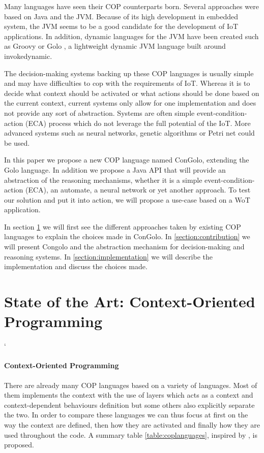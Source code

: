 \documentclass[a4paper]{article}
\begin{document}
Many languages have seen their COP counterparts born. Several approaches were based on Java and the JVM. Because of its high development in embedded system, the JVM seems to be a good candidate for the development of IoT applications. In addition, dynamic languages for the JVM have been created such as Groovy or Golo \cite{ponge_golo_2013}, a lightweight dynamic JVM language built around invokedynamic.

The decision-making systems backing up these COP languages is usually simple and may have difficulties to cop with the requirements of IoT. Whereas it is to decide what context should be activated or what actions should be done based on the current context, current systems only allow for one implementation and does not provide any sort of abstraction. Systems are often simple event-condition-action (ECA) process which do not leverage the full potential of the IoT. More advanced systems such as neural networks, genetic algorithms or Petri net could be used.

In this paper we propose a new COP language named ConGolo, extending the Golo language. In addition we propose a Java API that will provide an abstraction of the reasoning mechanisms, whether it is a simple event-condition-action (ECA), an automate, a neural network or yet another approach. To test our solution and put it into action, we will propose a use-case based on a WoT application.

In section \ref{section:stateoftheart} we will first see the different approaches taken by existing COP languages to explain the choices made in ConGolo. In \ref{section:contribution} we will present Congolo and the abstraction mechanism for decision-making and reasoning systems. In \ref{section:implementation} we will describe the implementation and discuss the choices made.

\section{State of the Art: Context-Oriented Programming}
\label{section:stateoftheart}
`
\paragraph{Context-Oriented Programming}
There are already many COP languages based on a variety of languages. Most of them implements the context with the use of layers which acts as a context and context-dependent behaviours definition but some others also explicitly separate the two. In order to compare these languages we can thus focus at first on the way the context are defined, then how they are activated and finally how they are used throughout the code. A summary table \ref{table:coplanguages}, inspired by \cite{appeltauer_comparison_2009}, is proposed.
\end{document}
